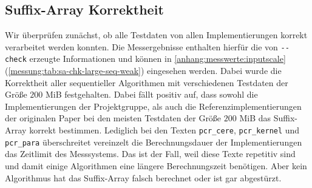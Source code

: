 \subsection{Suffix-Array Korrektheit}

Wir überprüfen zunächst, ob alle Testdaten von allen Implementierungen korrekt verarbeitet werden konnten. Die Messergebnisse enthalten hierfür die von \texttt{-{}-check} erzeugte Informationen und können in \cref{anhang:messwerte:inputscale} (\cref{messung:tab:sa-chk-large-seq-weak}) eingesehen werden. Dabei wurde die Korrektheit aller sequentieller Algorithmen mit verschiedenen Testdaten der Größe $200$ MiB festgehalten. Dabei fällt positiv auf, dass sowohl die Implementierungen der Projektgruppe, als auch die Referenzimplementierungen der originalen Paper bei den meisten Testdaten der Größe $200$ MiB das Suffix-Array korrekt bestimmen. Lediglich bei den Texten \texttt{pcr\_cere}, \texttt{pcr\_kernel} und \texttt{pcr\_para} überschreitet vereinzelt die Berechnungsdauer der Implementierungen das Zeitlimit des Messsystems. Das ist der Fall, weil diese Texte repetitiv sind und damit einige Algorithmen eine längere Berechnungszeit benötigen. Aber kein Algorithmus hat das Suffix-Array falsch berechnet oder ist gar abgestürzt.
